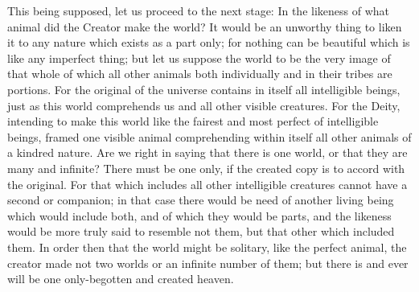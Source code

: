\documentclass[11pt,letter]{article}
\begin{document}
\par  This being supposed, let us proceed to the next stage: In the likeness of what animal did the Creator make the world? It would be an unworthy thing to liken it to any nature which exists as a part only; for nothing can be beautiful which is like any imperfect thing; but let us suppose the world to be the very image of that whole of which all other animals both individually and in their tribes are portions. For the original of the universe contains in itself all intelligible beings, just as this world comprehends us and all other visible creatures. For the Deity, intending to make this world like the fairest and most perfect of intelligible beings, framed one visible animal comprehending within itself all other animals of a kindred nature. Are we right in saying that there is one world, or that they are many and infinite? There must be one only, if the created copy is to accord with the original. For that which includes all other intelligible creatures cannot have a second or companion; in that case there would be need of another living being which would include both, and of which they would be parts, and the likeness would be more truly said to resemble not them, but that other which included them. In order then that the world might be solitary, like the perfect animal, the creator made not two worlds or an infinite number of them; but there is and ever will be one only-begotten and created heaven.
\end{document}
